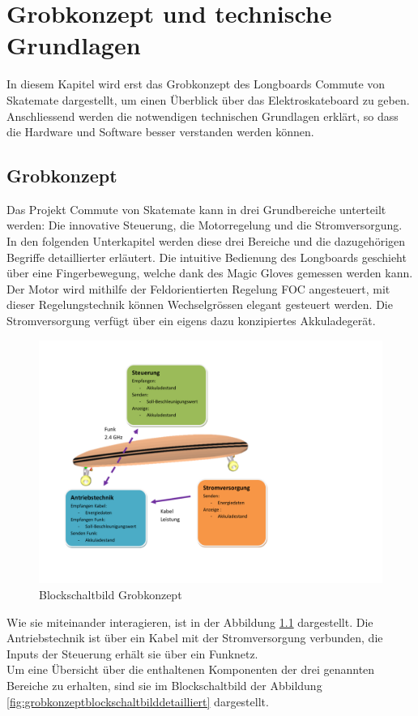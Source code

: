 \chapter{Grobkonzept und technische Grundlagen}
\label{TechnischeGrundlagen}
In diesem Kapitel wird erst das Grobkonzept des Longboards Commute von Skatemate dargestellt, um einen Überblick über das Elektroskateboard zu geben.
Anschliessend werden die notwendigen technischen Grundlagen erklärt, so dass die Hardware und Software besser verstanden werden können.


\section{Grobkonzept}
\label{Grobkonzept}

Das Projekt Commute von Skatemate kann in drei Grundbereiche unterteilt werden: Die innovative Steuerung, die Motorregelung und die Stromversorgung. 
In den folgenden Unterkapitel werden diese drei Bereiche und die dazugehörigen Begriffe detaillierter erläutert. Die intuitive Bedienung des Longboards geschieht über eine Fingerbewegung, welche dank des Magic Gloves gemessen werden kann. Der Motor wird mithilfe der Feldorientierten Regelung FOC angesteuert, mit dieser Regelungstechnik können Wechselgrössen elegant gesteuert werden. Die Stromversorgung verfügt über ein eigens dazu konzipiertes Akkuladegerät. 
\begin{figure}[H]
	\centering
	\includegraphics[width=0.8\linewidth, keepaspectratio]{images/Grobkonzept_Blockschaltbild_grob}
	\caption[Blockschaltbild Grobkonzept]{Blockschaltbild Grobkonzept}
	\label{fig:grobkonzeptblockschaltbildgrob}
\end{figure}
Wie sie miteinander interagieren, ist in der Abbildung \ref{fig:grobkonzeptblockschaltbildgrob} dargestellt. Die Antriebstechnik ist über ein Kabel mit der Stromversorgung verbunden, die Inputs der Steuerung erhält sie über ein Funknetz. \\
Um eine Übersicht über die enthaltenen Komponenten der drei genannten Bereiche zu erhalten, sind sie im Blockschaltbild der Abbildung \ref{fig:grobkonzeptblockschaltbilddetailliert} dargestellt.


